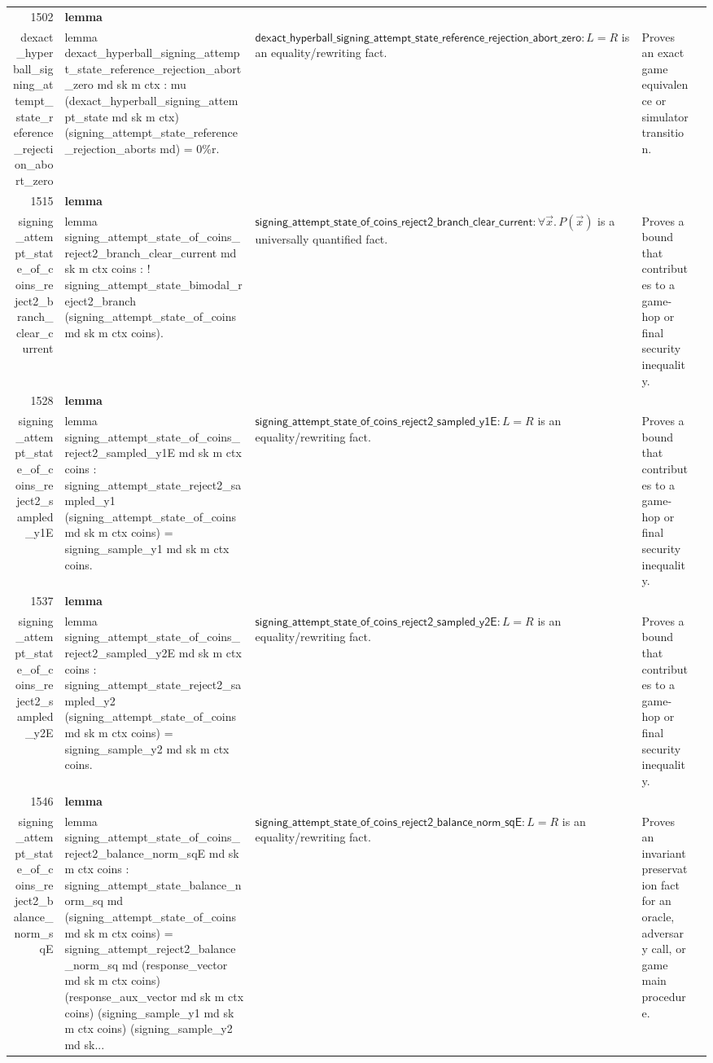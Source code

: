 \documentclass[10pt]{article}
\newcommand{\ec}[1]{\begingroup\ttfamily\scriptsize #1\endgroup}
\begin{document}
\begin{longtable}{r L{0.17\textwidth} L{0.26\textwidth} L{0.27\textwidth} L{0.20\textwidth}}
1502 & \textbf{lemma}\\\ec{dexact\_hyperball\_signing\_attempt\_state\_reference\_rejection\_abort\_zero} & \ec{lemma dexact\_hyperball\_signing\_attempt\_state\_reference\_rejection\_abort\_zero md sk m ctx : mu (dexact\_hyperball\_signing\_attempt\_state md sk m ctx) (signing\_attempt\_state\_reference\_rejection\_aborts md) = 0\%r.} & \(\mathsf{dexact\_hyperball\_signing\_attempt\_state\_reference\_rejection\_abort\_zero} : L = R\) is an equality/rewriting fact. & Proves an exact game equivalence or simulator transition. \\
1515 & \textbf{lemma}\\\ec{signing\_attempt\_state\_of\_coins\_reject2\_branch\_clear\_current} & \ec{lemma signing\_attempt\_state\_of\_coins\_reject2\_branch\_clear\_current md sk m ctx coins : ! signing\_attempt\_state\_bimodal\_reject2\_branch (signing\_attempt\_state\_of\_coins md sk m ctx coins).} & \(\mathsf{signing\_attempt\_state\_of\_coins\_reject2\_branch\_clear\_current} : \forall \vec{x}.\, P(\vec{x})\) is a universally quantified fact. & Proves a bound that contributes to a game-hop or final security inequality. \\
1528 & \textbf{lemma}\\\ec{signing\_attempt\_state\_of\_coins\_reject2\_sampled\_y1E} & \ec{lemma signing\_attempt\_state\_of\_coins\_reject2\_sampled\_y1E md sk m ctx coins : signing\_attempt\_state\_reject2\_sampled\_y1 (signing\_attempt\_state\_of\_coins md sk m ctx coins) = signing\_sample\_y1 md sk m ctx coins.} & \(\mathsf{signing\_attempt\_state\_of\_coins\_reject2\_sampled\_y1E} : L = R\) is an equality/rewriting fact. & Proves a bound that contributes to a game-hop or final security inequality. \\
1537 & \textbf{lemma}\\\ec{signing\_attempt\_state\_of\_coins\_reject2\_sampled\_y2E} & \ec{lemma signing\_attempt\_state\_of\_coins\_reject2\_sampled\_y2E md sk m ctx coins : signing\_attempt\_state\_reject2\_sampled\_y2 (signing\_attempt\_state\_of\_coins md sk m ctx coins) = signing\_sample\_y2 md sk m ctx coins.} & \(\mathsf{signing\_attempt\_state\_of\_coins\_reject2\_sampled\_y2E} : L = R\) is an equality/rewriting fact. & Proves a bound that contributes to a game-hop or final security inequality. \\
1546 & \textbf{lemma}\\\ec{signing\_attempt\_state\_of\_coins\_reject2\_balance\_norm\_sqE} & \ec{lemma signing\_attempt\_state\_of\_coins\_reject2\_balance\_norm\_sqE md sk m ctx coins : signing\_attempt\_state\_balance\_norm\_sq md (signing\_attempt\_state\_of\_coins md sk m ctx coins) = signing\_attempt\_reject2\_balance\_norm\_sq md (response\_vector md sk m ctx coins) (response\_aux\_vector md sk m ctx coins) (signing\_sample\_y1 md sk m ctx coins) (signing\_sample\_y2 md sk...} & \(\mathsf{signing\_attempt\_state\_of\_coins\_reject2\_balance\_norm\_sqE} : L = R\) is an equality/rewriting fact. & Proves an invariant preservation fact for an oracle, adversary call, or game main procedure. \\

\end{longtable}
\end{document}

